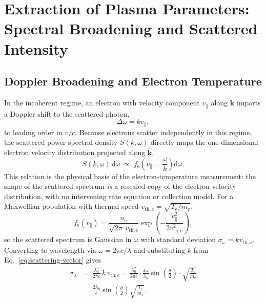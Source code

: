 \section{Extraction of Plasma Parameters: Spectral Broadening and Scattered Intensity}
\label{sec:te-derivation}

\subsection{Doppler Broadening and Electron Temperature}

In the incoherent regime, an electron with velocity component $v_{\parallel}$ along $\hat{\mathbf{k}}$ imparts a Doppler shift to the scattered photon,
\begin{equation}
\Delta\omega = k v_{\parallel},
\label{eq:doppler-shift}
\end{equation}
to leading order in $v/c$. Because electrons scatter independently in this regime, the scattered power spectral density $S(k,\omega)$ directly maps the one-dimensional electron velocity distribution projected along $\hat{\mathbf{k}}$,
\begin{equation}
S(k,\omega)\,\mathrm{d}\omega \;\propto\; f_{\mathrm{e}}\!\left(v_{\parallel} = \frac{\omega}{k}\right)\mathrm{d}\omega .
\label{eq:spectrum-from-fe}
\end{equation}
This relation is the physical basis of the electron-temperature measurement: the shape of the scattered spectrum \emph{is} a rescaled copy of the electron velocity distribution, with no intervening rate equation or collection model. For a Maxwellian population with thermal speed $v_{\mathrm{th,e}} = \sqrt{T_{\mathrm{e}}/m_{\mathrm{e}}}$,
\begin{equation}
f_{\mathrm{e}}(v_{\parallel}) = \frac{n_{\mathrm{e}}}{\sqrt{2\pi}\,v_{\mathrm{th,e}}}
\exp\!\left(-\frac{v_{\parallel}^{2}}{2v_{\mathrm{th,e}}^{2}}\right),
\label{eq:maxwellian-1d}
\end{equation}
so the scattered spectrum is Gaussian in $\omega$ with standard deviation $\sigma_{\omega} = k v_{\mathrm{th,e}}$. Converting to wavelength via $\omega = 2\pi c/\lambda$ and substituting $k$ from Eq.~\eqref{eq:scattering-vector} gives
\begin{align}
\sigma_{\lambda} &= \frac{\lambda_{0}^{2}}{2\pi c}\, k\, v_{\mathrm{th,e}}
= \frac{\lambda_{0}^{2}}{2\pi c}\cdot\frac{4\pi}{\lambda_{0}}\sin\!\left(\frac{\theta}{2}\right)\cdot\sqrt{\frac{T_{\mathrm{e}}}{m_{\mathrm{e}}}} \nonumber \\[2pt]
&= \frac{2\lambda_{0}}{c}\sin\!\left(\frac{\theta}{2}\right)\sqrt{\frac{T_{\mathrm{e}}}{m_{\mathrm{e}}}} .
\label{eq:sigma-lambda}
\end{align}
